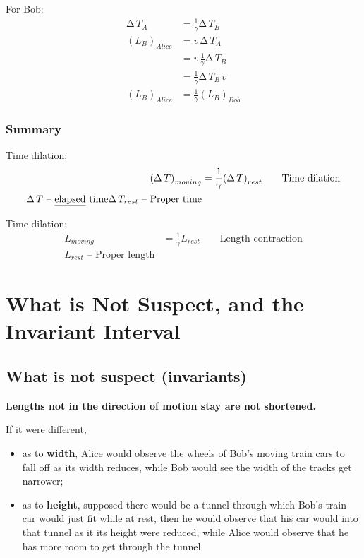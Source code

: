 \documentclass[pagesize,headsepline,10pt,parskip=half]{scrreprt}
\newcommand{\strong}[1]{\textbf{#1}}
\newcommand*\mdelta[1]{\ensuremath{\mathrm{\Delta\,}#1}}
\begin{document}
      For Bob:
      \begin{align*}
        \mdelta{T_A} &= \frac{1}{\gamma} \mdelta{T_B}\\
        {\left(L_B\right)}_{Alice} &= v\,\mdelta{T_A}\\
        &= v\,\frac{1}{\gamma} \mdelta{T_B}\\
        &= \frac{1}{\gamma} \mdelta{T_B}\,v\\
        {\left(L_B\right)}_{Alice} &= \frac{1}{\gamma} {\left(L_B\right)}_{Bob}
      \end{align*}

      \subsubsection{Summary}
        Time dilation:
        \begin{align*}
          {\left(\mdelta{T}\right)}_{moving} &= \frac{1}{\gamma} {\left(\mdelta{T}\right)}_{rest} \qquad  \text{Time dilation}\\
          \mdelta{T}\text{ – \underline{elapsed} time}
          \mdelta{T}_{rest}\text{ – Proper time}
        \end{align*}

        Time dilation:
        \begin{align*}
          L_{moving} &= \frac{1}{\gamma} L_{rest} \qquad \text{Length contraction}\\
          L_{rest}\text{ – Proper length}
        \end{align*}

    \section{What is Not Suspect, and the Invariant Interval}
      \subsection{What is not suspect (invariants)}
        \strong{Lengths not in the direction of motion stay are not shortened.}

        If it were different,
        \begin{itemize}
          \item as to \strong{width}, Alice would observe the wheels of Bob’s
            moving train cars to fall off as its width reduces, while Bob
            would see the width of the tracks get narrower;
          \item as to \strong{height}, supposed there would be a tunnel through
            which Bob’s train car would just fit while at rest, then he would
            observe that his car would into that tunnel as it its height were
            reduced, while Alice would observe that he has more room to get
            through the tunnel.
        \end{itemize}
\end{document}
